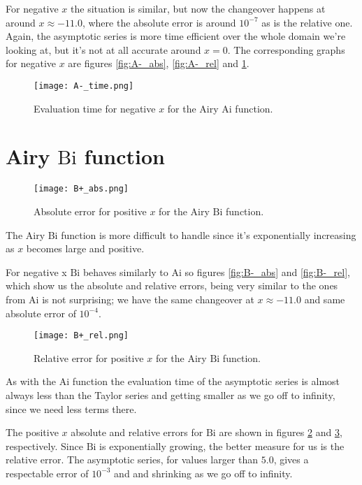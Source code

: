 \documentclass[10pt,a4paper,twocolumn]{article}
\newcommand{\Ai}{\mathrm{Ai}}
\newcommand{\Bi}{\mathrm{Bi}}
\begin{document}
For negative $x$ the situation is similar, but now the changeover happens at around $x \approx -11.0$, where the absolute error is around $10^{-7}$ as is the relative one. Again, the asymptotic series is more time efficient over the whole domain we're looking at, but it's not at all accurate around $x=0$. The corresponding graphs for negative $x$ are figures \ref{fig:A-_abs}, \ref{fig:A-_rel} and \ref{fig:A-_time}.

\begin{figure}[H]
\centering
\captionsetup{justification=centering}
\texttt{[image: A-\_time.png]}
\caption{Evaluation time for negative $x$ for the Airy $\Ai$ function.}
\label{fig:A-_time}
\end{figure}


\section{Airy $\Bi$ function}

\begin{figure}[H]
\centering
\captionsetup{justification=centering}
\texttt{[image: B+\_abs.png]}
\caption{Absolute error for positive $x$ for the Airy $\Bi$ function.}
\label{fig:B+_abs}
\end{figure}

The Airy Bi function is more difficult to handle since it's exponentially increasing as $x$ becomes large and positive.

For negative x $\Bi$ behaves similarly to $\Ai$ so figures \ref{fig:B-_abs} and \ref{fig:B-_rel}, which show us the absolute and relative errors, being very similar to the ones from $\Ai$ is not surprising; we have the same changeover at $x \approx -11.0$ and same absolute error of $10^{-4}$.

\begin{figure}[H]
\centering
\captionsetup{justification=centering}
\texttt{[image: B+\_rel.png]}
\caption{Relative error for positive $x$ for the Airy $\Bi$ function.}
\label{fig:B+_rel}
\end{figure}

As with the $\Ai$ function the evaluation time of the asymptotic series is almost always less than the Taylor series and getting smaller as we go off to infinity, since we need less terms there.

The positive $x$ absolute and relative errors for $\Bi$ are shown in figures \ref{fig:B+_abs} and \ref{fig:B+_rel}, respectively. Since $\Bi$ is exponentially growing, the better measure for us is the relative error. The asymptotic series, for values larger than $5.0$, gives a respectable error of $10^{-3}$ and and shrinking as we go off to infinity.
\end{document}
